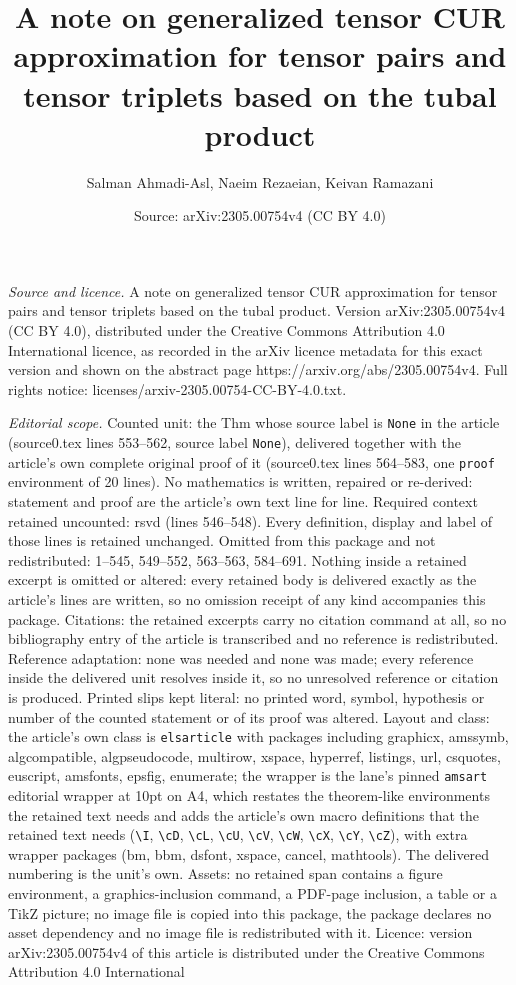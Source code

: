 \documentclass[10pt,a4paper]{amsart}
\title[A note on generalized tensor CUR approximation for tensor pa]{A note on generalized tensor CUR approximation for tensor pairs and tensor triplets based on the tubal product}
\author{Salman Ahmadi-Asl, Naeim Rezaeian, Keivan Ramazani}
\date{Source: arXiv:2305.00754v4 (CC BY 4.0)}
\begin{document}
\maketitle

\noindent\emph{Source and licence.} A note on generalized tensor CUR approximation for tensor pairs and tensor triplets based on the tubal product. Version arXiv:2305.00754v4 (CC BY 4.0), distributed under the Creative Commons Attribution 4.0 International licence, as recorded in the arXiv licence metadata for this exact version and shown on the abstract page https://arxiv.org/abs/2305.00754v4. Full rights notice: licenses/arxiv-2305.00754-CC-BY-4.0.txt.\par\smallskip

\noindent\textit{Editorial scope.} Counted unit: the Thm whose source label is \texttt{None} in the article (source0.tex lines 553--562, source label \texttt{None}), delivered together with the article's own complete original proof of it (source0.tex lines 564--583, one \texttt{proof} environment of 20 lines). No mathematics is written, repaired or re-derived: statement and proof are the article's own text line for line. Required context retained uncounted: rsvd (lines 546--548). Every definition, display and label of those lines is retained unchanged. Omitted from this package and not redistributed: 1--545, 549--552, 563--563, 584--691. Nothing inside a retained excerpt is omitted or altered: every retained body is delivered exactly as the article's lines are written, so no omission receipt of any kind accompanies this package. Citations: the retained excerpts carry no citation command at all, so no bibliography entry of the article is transcribed and no reference is redistributed. Reference adaptation: none was needed and none was made; every reference inside the delivered unit resolves inside it, so no unresolved reference or citation is produced. Printed slips kept literal: no printed word, symbol, hypothesis or number of the counted statement or of its proof was altered. Layout and class: the article's own class is \texttt{elsarticle} with packages including graphicx, amssymb, algcompatible, algpseudocode, multirow, xspace, hyperref, listings, url, csquotes, euscript, amsfonts, epsfig, enumerate; the wrapper is the lane's pinned \texttt{amsart} editorial wrapper at 10pt on A4, which restates the theorem-like environments the retained text needs and adds the article's own macro definitions that the retained text needs (\texttt{\textbackslash I}, \texttt{\textbackslash cD}, \texttt{\textbackslash cL}, \texttt{\textbackslash cU}, \texttt{\textbackslash cV}, \texttt{\textbackslash cW}, \texttt{\textbackslash cX}, \texttt{\textbackslash cY}, \texttt{\textbackslash cZ}), with extra wrapper packages (bm, bbm, dsfont, xspace, cancel, mathtools). The delivered numbering is the unit's own. Assets: no retained span contains a figure environment, a graphics-inclusion command, a PDF-page inclusion, a table or a TikZ picture; no image file is copied into this package, the package declares no asset dependency and no image file is redistributed with it. Licence: version arXiv:2305.00754v4 of this article is distributed under the Creative Commons Attribution 4.0 International 
\end{document}
